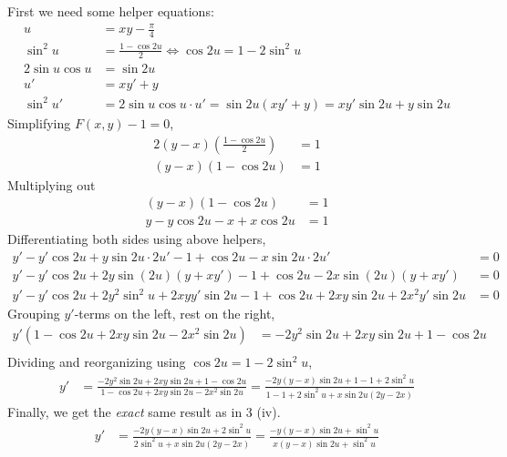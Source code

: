 First we need some helper equations:
\begin{align*}
  u &= xy-\frac{\pi}{4} \\
  \sin^2{u} &= \frac{1-\cos{2u}}{2}
      \iff \cos{2u} = 1 - 2\sin^2{u} \\
  2\sin{u}\cos{u} &= \sin{2u} \\
  u' &= xy' + y \\
  \sin^2{u}' &= 2\sin{u}\cos{u}\cdot u' = \sin{2u}(xy'+y) =
      xy'\sin{2u}+y\sin{2u}
\end{align*}
Simplifying $F(x,y)-1 = 0$,
\begin{align*}
  2(y-x)\left(\frac{1-\cos{2u}}{2}\right) &= 1 \\
  (y-x)(1-\cos{2u}) &= 1
\end{align*}
Multiplying out
\begin{align*}
  (y-x)(1-\cos{2u}) &= 1 \\
  y - y\cos{2u} -x + x\cos{2u} &= 1
\end{align*}
Differentiating both sides using above helpers,
\begin{align*}
  y' - y'\cos{2u} + y\sin{2u}\cdot 2u' - 1 + \cos{2u} - x\sin{2u}\cdot 2u' &= 0 \\
  y' - y'\cos{2u} + 2y\sin{(2u)}(y+xy') - 1 + \cos{2u} - 2x\sin{(2u)}(y+xy') &= 0 \\
  y' - y'\cos{2u} + 2y^2\sin^2{u} + 2xyy'\sin{2u} - 1 + \cos{2u}
    +2xy\sin{2u} + 2x^2y'\sin{2u} &= 0
\end{align*}
Grouping $y'$-terms on the left, rest on the right,
\begin{align*}
  y'\left( 1 - \cos{2u} + 2xy\sin{2u} - 2x^2\sin{2u} \right)
    &= -2y^2\sin{2u} + 2xy\sin{2u} + 1 - \cos{2u} \\
\end{align*}
Dividing and reorganizing using $\cos{2u} = 1 - 2\sin^2{u}$,
\begin{align*}
  y' &= \frac{-2y^2\sin{2u} + 2xy\sin{2u} + 1 - \cos{2u}}
             {1 - \cos{2u} + 2xy\sin{2u} - 2x^2\sin{2u}}
      = \frac{-2y(y-x)\sin{2u} + 1 - 1 + 2\sin^2{u}}
             {1 - 1 + 2\sin^2{u} + x\sin{2u}(2y-2x)}
\end{align*}
Finally, we get the \textit{exact} same result as in 3 (iv).
\begin{align*}
  y' &= \frac{-2y(y-x)\sin{2u} + 2\sin^2{u}}
             {2\sin^2{u} + x\sin{2u}(2y-2x)}
      = \frac{-y(y-x)\sin{2u} + \sin^2{u}}
             {x(y-x)\sin{2u} + \sin^2{u}}
\end{align*}

